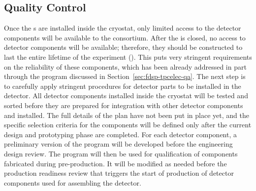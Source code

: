 \subsection{Quality Control}
\label{sec:fdsp-tpcelec-production-qc}

Once the s are installed inside the cryostat, only
limited access to the detector components will be available to the 
consortium. After the  is closed, no access to detector
components will be available; therefore, they should be constructed to
last the entire lifetime of the experiment (\dunelifetime). This
puts very stringent requirements on the reliability of these
components, which has been already addressed in part through 
the  program discussed in Section~\ref{sec:fdsp-tpcelec-qa}. The
next step is to carefully apply stringent  procedures for  
detector parts to be installed in the detector.
All detector components installed inside the cryostat will
be tested and sorted before they are prepared for integration
with other detector components and installed. The full
details of the  plan have not been put in place
yet, and the specific selection criteria for the components will
be defined only after the current design and
prototyping phase are completed. For each detector component, a preliminary
version of the  program will be developed before the engineering design
review. The program will then be used for
qualification of components fabricated during 
pre-production. It will be modified as needed before the production
readiness review that triggers the start of production of detector components
used for assembling the detector.


